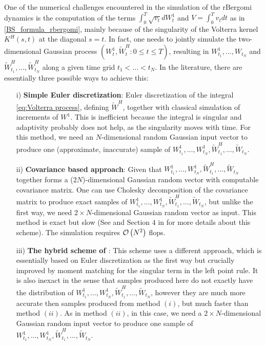 One of the numerical challenges encountered in the simulation of the rBergomi dynamics  is the computation of the terms  $\int_{0}^{T} \sqrt{v_t} dW_t^1$ and $V=\int_{0}^{T} v_t dt$ as in \eqref{BS_formula_rbergomi}, mainly because of the singularity of the Volterra kernel $K^H(s,t)$ at the diagonal $s = t$. In fact,  one needs to jointly simulate the two-dimensional Gaussian process $(W_t^1, \widetilde{W}^H_t: 0 \le t \le T)$, resulting in $W^1_{t_1},\dots, W_{t_N}$ and $\widetilde{W}^H_{t_1},\dots, \widetilde{W}^H_{t_N}$ along a given time grid $t_1 <\dots < t_N$. In the literature, there are essentially three possible ways to achieve this:
 \begin{enumerate}
 	\item[i)] \textbf{Simple Euler discretization}: Euler discretization of the integral \eqref{eq:Volterra process}, defining $\widetilde{W}^H$, together with classical simulation of increments of $W^1$. This is inefficient because the integral is singular and adaptivity probably does not help, as the singularity moves with time. For this method, we need an $N$-dimensional random Gaussian input vector to produce one (approximate, inaccurate) sample of $W^1_{t_1},\dots, W^1_{t_N}, \widetilde{W}^H_{t_1},\dots, \widetilde{W}_{t_N}$.
 	
 	\item[ii)] \textbf{Covariance based approach}: Given that $W^1_{t_1},\dots, W^1_{t_N}, \widetilde{W}^H_{t_1},\dots, \widetilde{W}_{t_N}$ together forms a ($2N$)-dimensional Gaussian random vector with computable covariance matrix. One can use Cholesky decomposition of the covariance matrix to produce exact samples of $W^1_{t_1},\dots, W^1_{t_N}, \widetilde{W}^H_{t_1},\dots, \widetilde{W}_{t_N}$, but unlike the first way, we need $2 \times N$-dimensional Gaussian random vector as
 	input. This method is exact but slow (See  \cite{bayer2016pricing} and Section $4$ in \cite{bayer2017short} for more details about this scheme). The simulation  requires ${\mathcal{O}}\left(N^2\right)$ flops. 
 	
 	\item[iii)]  \textbf{The hybrid scheme of \cite{bennedsen2017hybrid}}: This scheme uses a different approach, which is essentially based on  Euler discretization as the first way but crucially improved by moment
 	matching for the singular term in the left point rule. It is also
 	inexact in the sense that samples produced here do not exactly have the distribution of $W^1_{t_1},\dots, W^1_{t_N}, \widetilde{W}^H_{t_1},\dots, \widetilde{W}_{t_N}$, however they are much more accurate then samples produced from method $(i)$, but much faster than method $(ii)$. As in method $(ii)$, in this case, we need a $2 \times N$-dimensional Gaussian random input vector to produce one
 	sample of $W^1_{t_1},\dots, W^1_{t_N}, \widetilde{W}^H_{t_1},\dots, \widetilde{W}_{t_N}$. 
 \end{enumerate}
